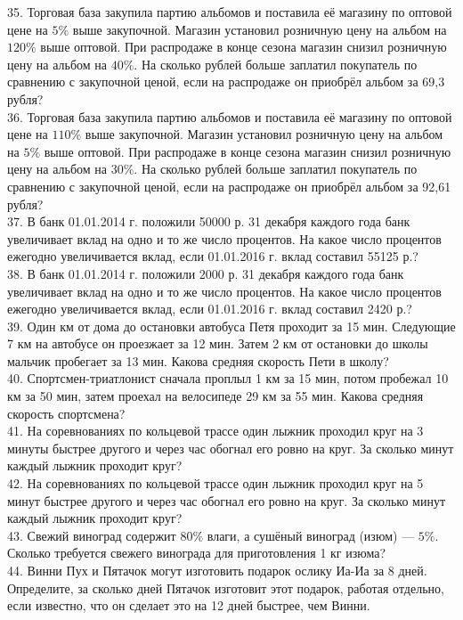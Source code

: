 35. Торговая база закупила партию альбомов и поставила её магазину по оптовой цене на $5\%$ выше закупочной. Магазин установил розничную цену на альбом на $120\%$ выше оптовой. При распродаже в конце сезона магазин снизил розничную цену на альбом на $40\%.$ На сколько рублей больше заплатил покупатель по сравнению с закупочной ценой, если на распродаже он приобрёл альбом за 69,3 рубля?\\
36. Торговая база закупила партию альбомов и поставила её магазину по оптовой цене на $110\%$ выше закупочной. Магазин установил розничную цену на альбом на $5\%$ выше оптовой. При распродаже в конце сезона магазин снизил розничную цену на альбом на $30\%.$ На сколько рублей больше заплатил покупатель по сравнению с закупочной ценой, если на распродаже он приобрёл альбом за 92,61 рубля?\\
37. В банк 01.01.2014 г. положили 50000 р. 31 декабря каждого года банк увеличивает вклад на одно и то же число процентов. На какое число процентов ежегодно увеличивается вклад, если 01.01.2016 г. вклад составил 55125 р.?\\
38. В банк 01.01.2014 г. положили 2000 р. 31 декабря каждого года банк увеличивает вклад на одно и то же число процентов. На какое число процентов ежегодно увеличивается вклад, если 01.01.2016 г. вклад составил 2420 р.?\\
39. Один км от дома до остановки автобуса Петя проходит за 15 мин. Следующие 7 км на автобусе он проезжает за 12 мин. Затем 2 км от остановки до школы мальчик пробегает за 13 мин. Какова средняя скорость Пети в школу?\\
40. Спортсмен-триатлонист сначала проплыл 1 км за 15 мин, потом пробежал 10 км за 50 мин, затем проехал на велосипеде 29 км за 55 мин. Какова средняя скорость спортсмена?\\
41. На соревнованиях по кольцевой трассе один лыжник проходил круг на 3 минуты быстрее другого и через час обогнал его ровно на круг. За сколько минут каждый лыжник проходит круг?\\
42. На соревнованиях по кольцевой трассе один лыжник проходил круг на 5 минут быстрее другого и через час обогнал его ровно на круг. За сколько минут каждый лыжник проходит круг?\\
43. Свежий виноград содержит $80\%$ влаги, а сушёный виноград (изюм) --- $5\%.$ Сколько требуется свежего винограда для приготовления 1 кг изюма?\\
44. Винни Пух и Пятачок могут изготовить подарок ослику Иа-Иа за 8 дней. Определите, за сколько дней Пятачок изготовит этот подарок, работая отдельно, если известно, что он сделает это на 12 дней быстрее, чем Винни.\\
